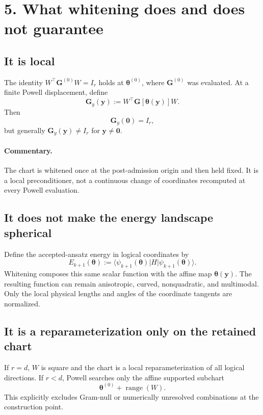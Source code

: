\documentclass[11pt]{article}
\newcommand{\ket}[1]{\lvert #1\rangle}
\newcommand{\bra}[1]{\langle #1\rvert}
\newcommand{\commentary}{\paragraph{Commentary.}}
\begin{document}
\section*{5. What whitening does and does not guarantee}

\subsection*{It is local}

The identity
\(W^\top\mathbf G^{(0)}W=I_r\) holds at
\(\boldsymbol\theta^{(0)}\), where \(\mathbf G^{(0)}\) was evaluated.  At a
finite Powell displacement, define
\begin{equation}
\mathbf G_y(\mathbf y)
:=
W^\top
\mathbf G[\boldsymbol\theta(\mathbf y)]
W.
\label{eq:evolving-metric}
\end{equation}
Then
\begin{equation}
\mathbf G_y(\mathbf 0)=I_r,
\end{equation}
but generally
\(\mathbf G_y(\mathbf y)\ne I_r\) for
\(\mathbf y\ne\mathbf 0\).

\commentary The chart is whitened once at the post-admission origin and then
held fixed.  It is a local preconditioner, not a continuous change of
coordinates recomputed at every Powell evaluation.

\subsection*{It does not make the energy landscape spherical}

Define the accepted-ansatz energy in logical coordinates by
\begin{equation}
E_{k+1}(\boldsymbol\theta)
:=
\bra{\psi_{k+1}(\boldsymbol\theta)}
H
\ket{\psi_{k+1}(\boldsymbol\theta)}.
\label{eq:logical-energy}
\end{equation}
Whitening composes this same scalar function with the affine map
\(\boldsymbol\theta(\mathbf y)\).  The resulting function can remain
anisotropic, curved, nonquadratic, and multimodal.  Only the local physical
lengths and angles of the coordinate tangents are normalized.

\subsection*{It is a reparameterization only on the retained chart}

If \(r=d\), \(W\) is square and the chart is a local reparameterization of all
logical directions.  If \(r<d\), Powell searches only the affine supported
subchart
\begin{equation}
\boldsymbol\theta^{(0)}
+\operatorname{range}(W).
\label{eq:supported-affine-chart}
\end{equation}
This explicitly excludes Gram-null or numerically unresolved combinations at
the construction point.
\end{document}
